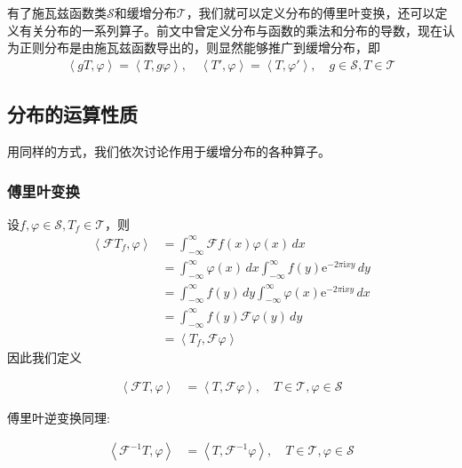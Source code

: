 有了施瓦兹函数类$\mathcal{S} $和缓增分布$\mathcal{T} $，我们就可以定义分布的傅里叶变换，还可以定义有关分布的一系列算子。前文中曾定义分布与函数的乘法和分布的导数，现在认为正则分布是由施瓦兹函数导出的，则显然能够推广到缓增分布，即\begin{align}
    \left\langle gT,\varphi\right\rangle=\left\langle T,g\varphi\right\rangle,\quad\left\langle T',\varphi\right\rangle=\left\langle T,\varphi'\right\rangle,\quad g\in\mathcal{S} ,T\in\mathcal{T}
\end{align}

\subsection{分布的运算性质}\label{sub:operation_of_distribution}
用同样的方式，我们依次讨论作用于缓增分布的各种算子。

\subsubsection{傅里叶变换}

设$f,\varphi\in\mathcal{S} ,T_f\in\mathcal{T} $，则
\begin{align*}
    \left\langle\mathcal{F}T_f,\varphi\right\rangle&=\int_{-\infty}^{\infty}\mathcal{F}f(x)\varphi(x)\,dx\\
    &=\int_{-\infty}^{\infty}\varphi(x)\,dx\int_{-\infty}^{\infty}f(y)\mathrm{e}^{-2\pi\mathrm{i}xy}\,dy\\
    & =\int_{-\infty}^{\infty}f(y)\,dy\int_{-\infty}^{\infty}\varphi(x)\mathrm{e}^{-2\pi \mathrm{i}xy}\,dx\\
    & =\int_{-\infty}^{\infty}f(y)\mathcal{F}\varphi(y)\,dy\\
    &=\left\langle T_f,\mathcal{F}\varphi\right\rangle
\end{align*}
因此我们定义\begin{definition}[分布的傅里叶变换]
    \begin{align*}
        \left\langle \mathcal{F} T,\varphi\right\rangle & =\left\langle T,\mathcal{F} \varphi\right\rangle,\quad T\in\mathcal{T} ,\varphi\in\mathcal{S}
    \end{align*}
\end{definition}

傅里叶逆变换同理:
\begin{definition}[分布的傅里叶反变换]
    \begin{align*}
        \left\langle \mathcal{F} ^{-1}T,\varphi\right\rangle & =\left\langle T,\mathcal{F} ^{-1}\varphi\right\rangle,\quad T\in\mathcal{T} ,\varphi\in\mathcal{S}
    \end{align*}
\end{definition}

